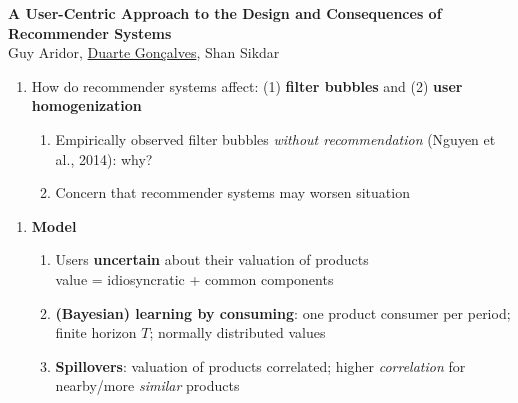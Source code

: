 \documentclass[8pt, aspectratio=43,usenames,dvipsnames]{beamer} %
\begin{document}

{
\begin{frame}
\begin{center}
\textbf{\color{titleblue}A User-Centric Approach to the Design and Consequences of Recommender Systems}\\
Guy Aridor, \underline{Duarte Gon\c{c}alves}, Shan Sikdar
\end{center}
\begin{enumerate}
\itemsep=1.5em
\setlength{\itemindent}{-1.25em}
\item How do recommender systems affect: (1) \textbf{filter bubbles} and (2) \textbf{user homogenization}
	\begin{enumerate}
	\vspace{.5em}
	\itemsep=.8em
	\setlength{\itemindent}{-3em}
	\normalsize
	\item Empirically observed filter bubbles \textit{without recommendation} (Nguyen et al., 2014): why?
	\item Concern that recommender systems may worsen situation
	\end{enumerate}
\end{enumerate}
\begin{minipage}{.75\textwidth}
\begin{enumerate}
\itemsep=1.5em
\setlength{\itemindent}{-1.25em}
\item \textbf{Model}
	\begin{enumerate}
	\vspace{.5em}
	\itemsep=.8em
	\setlength{\itemindent}{-3em}
	\normalsize
	\item Users \textbf{uncertain} about their valuation of products\\
	value = idiosyncratic + common components
	\item \textbf{(Bayesian) learning by consuming}: one product consumer per period; finite horizon $T$; normally distributed values
	\item \textbf{Spillovers}: valuation of products correlated; higher \textit{correlation} for nearby/more \textit{similar} products
	\end{enumerate}

\end{enumerate}
\end{minipage}
\end{frame}}
\end{document}
